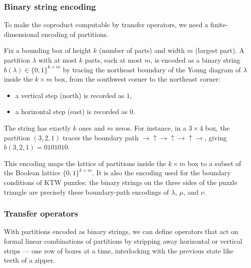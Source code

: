\subsubsection*{Binary string encoding}

To make the coproduct computable by transfer operators, we need a
finite-dimensional encoding of partitions.

\begin{definition}
\label{def:binary-encoding}
Fix a bounding box of height $k$ (number of parts) and width $m$
(largest part).  A partition $\lambda$ with at most $k$ parts, each at
most $m$, is encoded as a binary string $b(\lambda) \in \{0,1\}^{k+m}$
by tracing the northeast boundary of the Young diagram of $\lambda$
inside the $k \times m$ box, from the southwest corner to the
northeast corner:
\begin{itemize}
\item a vertical step (north) is recorded as $1$,
\item a horizontal step (east) is recorded as $0$.
\end{itemize}
The string has exactly $k$ ones and $m$ zeros.  For instance, in a
$3 \times 4$ box, the partition $(3,2,1)$ traces the boundary path
$\rightarrow \uparrow \rightarrow \uparrow \rightarrow \uparrow
\rightarrow$, giving $b(3,2,1) = 0101010$.
\end{definition}

This encoding maps the lattice of partitions inside the $k \times m$
box to a subset of the Boolean lattice $\{0,1\}^{k+m}$.  It is also
the encoding used for the boundary conditions of KTW puzzles: the
binary strings on the three sides of the puzzle triangle are precisely
these boundary-path encodings of $\lambda$, $\mu$, and $\nu$.

\subsubsection*{Transfer operators}

With partitions encoded as binary strings, we can define operators
that act on formal linear combinations of partitions by stripping away
horizontal or vertical strips --- one row of boxes at a time,
interlocking with the previous state like teeth of a zipper.

